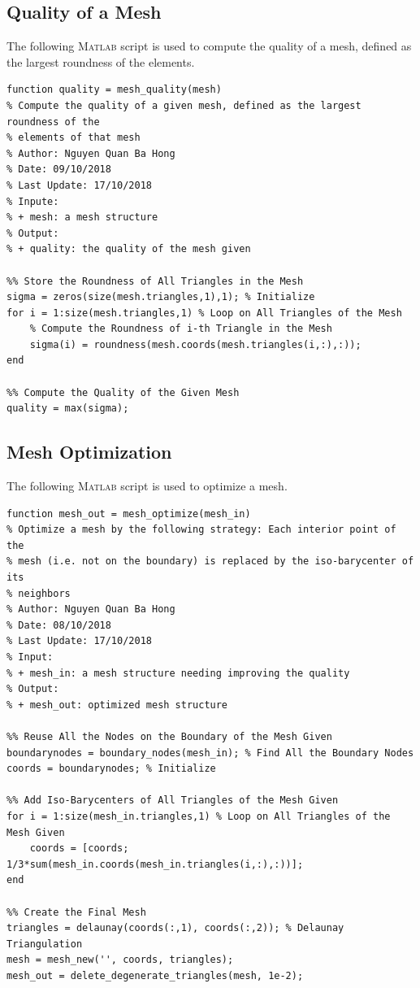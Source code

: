 \documentclass[11pt,a4paper,center,notitlepage]{article}
\numberwithin{equation}{section}
\begin{document}
\subsection{Quality of a Mesh}
The following \textsc{Matlab} script is used to compute the quality of a mesh, defined as the largest roundness of the elements.
\begin{verbatim}
function quality = mesh_quality(mesh)
% Compute the quality of a given mesh, defined as the largest roundness of the
% elements of that mesh
% Author: Nguyen Quan Ba Hong
% Date: 09/10/2018
% Last Update: 17/10/2018
% Inpute:
% + mesh: a mesh structure
% Output:
% + quality: the quality of the mesh given

%% Store the Roundness of All Triangles in the Mesh
sigma = zeros(size(mesh.triangles,1),1); % Initialize
for i = 1:size(mesh.triangles,1) % Loop on All Triangles of the Mesh
    % Compute the Roundness of i-th Triangle in the Mesh
    sigma(i) = roundness(mesh.coords(mesh.triangles(i,:),:)); 
end

%% Compute the Quality of the Given Mesh
quality = max(sigma);
\end{verbatim}

\subsection{Mesh Optimization}
The following \textsc{Matlab} script is used to optimize a mesh.
\begin{verbatim}
function mesh_out = mesh_optimize(mesh_in)
% Optimize a mesh by the following strategy: Each interior point of the
% mesh (i.e. not on the boundary) is replaced by the iso-barycenter of its
% neighbors
% Author: Nguyen Quan Ba Hong
% Date: 08/10/2018
% Last Update: 17/10/2018
% Input:
% + mesh_in: a mesh structure needing improving the quality
% Output: 
% + mesh_out: optimized mesh structure

%% Reuse All the Nodes on the Boundary of the Mesh Given
boundarynodes = boundary_nodes(mesh_in); % Find All the Boundary Nodes
coords = boundarynodes; % Initialize

%% Add Iso-Barycenters of All Triangles of the Mesh Given
for i = 1:size(mesh_in.triangles,1) % Loop on All Triangles of the Mesh Given
    coords = [coords; 1/3*sum(mesh_in.coords(mesh_in.triangles(i,:),:))];
end

%% Create the Final Mesh
triangles = delaunay(coords(:,1), coords(:,2)); % Delaunay Triangulation
mesh = mesh_new('', coords, triangles);
mesh_out = delete_degenerate_triangles(mesh, 1e-2); 
\end{verbatim}
\end{document}

